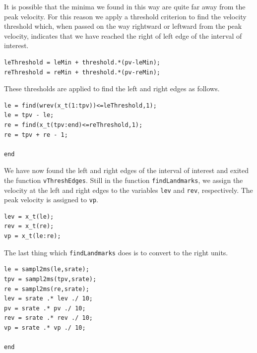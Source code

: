 \documentclass[a4paper, 12pt]{article}
\begin{document}
It is possible that the minima we found in this way are quite far away from the peak velocity. For this reason we apply a threshold criterion to find the velocity threshold which, when passed on the way rightward or leftward from the peak velocity, indicates that we have reached the right of left edge of the interval of interest.
\begin{verbatim}
leThreshold = leMin + threshold.*(pv-leMin);
reThreshold = reMin + threshold.*(pv-reMin);
\end{verbatim}
These thresholds are applied to find the left and right edges as follows.
\begin{verbatim}
le = find(wrev(x_t(1:tpv))<=leThreshold,1);
le = tpv - le;
re = find(x_t(tpv:end)<=reThreshold,1);
re = tpv + re - 1;

end
\end{verbatim}
We have now found the left and right edges of the interval of interest and exited the function \texttt{vThreshEdges}. Still in the function \texttt{findLandmarks}, we assign the velocity at the left and right edges to the variables \texttt{lev} and \texttt{rev}, respectively. The peak velocity is assigned to \texttt{vp}.
\begin{verbatim}
lev = x_t(le);
rev = x_t(re);
vp = x_t(le:re);
\end{verbatim}
The last thing which \texttt{findLandmarks} does is to convert to the right units.
\begin{verbatim}
le = sampl2ms(le,srate);
tpv = sampl2ms(tpv,srate);
re = sampl2ms(re,srate);
lev = srate .* lev ./ 10;
pv = srate .* pv ./ 10;
rev = srate .* rev ./ 10;
vp = srate .* vp ./ 10;

end
\end{verbatim}
\end{document}
